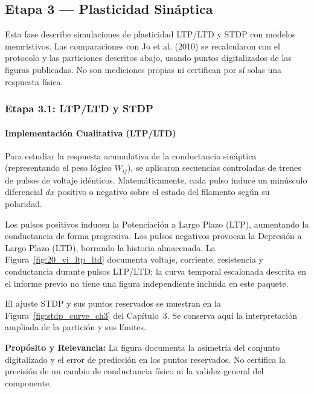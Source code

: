 
\subsection{Etapa 3 --- Plasticidad Sináptica}
\label{ch:fase3}

Esta fase describe simulaciones de plasticidad LTP/LTD y STDP con modelos
memristivos. Las comparaciones con Jo et al. (2010) se recalcularon con
el protocolo y las particiones descritos abajo, usando puntos
digitalizados de las figuras publicadas. No son mediciones propias ni
certifican por sí solas una respuesta física.

\subsubsection{Etapa 3.1: LTP/LTD y STDP}
\label{sec:etapa3_1}

\paragraph{Implementación Cualitativa (LTP/LTD)}
Para estudiar la respuesta acumulativa de la conductancia sináptica (representando el peso lógico $W_{ij}$), se aplicaron secuencias controladas de trenes de pulsos de voltaje idénticos. Matemáticamente, cada pulso induce un minúsculo diferencial $dx$ positivo o negativo sobre el estado del filamento según su polaridad. 

Los pulsos positivos inducen la Potenciación a Largo Plazo (LTP), aumentando la conductancia de forma progresiva. Los pulsos negativos provocan la Depresión a Largo Plazo (LTD), borrando la historia almacenada. La Figura~\ref{fig:20_vi_ltp_ltd} documenta voltaje, corriente, resistencia y conductancia durante pulsos LTP/LTD; la curva temporal escalonada descrita en el informe previo no tiene una figura independiente incluida en este paquete.

El ajuste STDP y sus puntos reservados se muestran en la Figura~\ref{fig:stdp_curve_ch3} del Cap\'itulo~3. Se conserva aqu\'i la interpretaci\'on ampliada de la partici\'on y sus l\'imites.

\textbf{Propósito y Relevancia:} La figura documenta la asimetría del conjunto digitalizado y el error de predicción en los puntos reservados. No certifica la precisión de un cambio de conductancia físico ni la validez general del componente.

